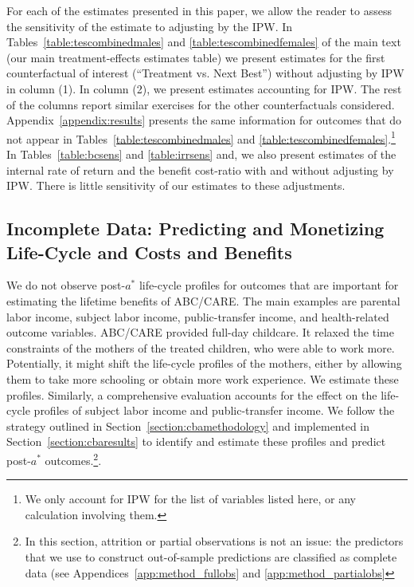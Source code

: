 \noindent For each of the estimates presented in this paper, we allow the reader to assess the sensitivity of the estimate to adjusting by the IPW. In Tables~\ref{table:tescombinedmales} and \ref{table:tescombinedfemales} of the main text (our main treatment-effects estimates table) we present estimates for the first counterfactual of interest (``Treatment vs. Next Best'') without adjusting by IPW in column (1). In column (2), we present estimates accounting for IPW. The rest of the columns report similar exercises for the other counterfactuals considered. Appendix~\ref{appendix:results} presents the same information for outcomes that do not appear in Tables~\ref{table:tescombinedmales} and \ref{table:tescombinedfemales}.\footnote{We only account for IPW for the list of variables listed here, or any calculation involving them.} In Tables~\ref{table:bcsens} and \ref{table:irrsens} and, we also present estimates of the internal rate of return and the benefit cost-ratio with and without adjusting by IPW. There is little sensitivity of our estimates to these adjustments.

\subsection{Incomplete Data: Predicting and Monetizing Life-Cycle and Costs and Benefits} \label{appendix:incomplete}
\label{app:method_noobs}

\noindent We do not observe post-$a^*$ life-cycle profiles for outcomes that are important for estimating the lifetime benefits of ABC/CARE. The main examples are parental labor income, subject labor income, public-transfer income, and health-related outcome variables. ABC/CARE provided full-day childcare. It relaxed the time constraints of the mothers of the treated children, who were able to work more. Potentially, it might shift the life-cycle profiles of the mothers, either by allowing them to take more schooling or obtain more work experience. We estimate these profiles. Similarly, a comprehensive evaluation accounts for the effect on the life-cycle profiles of subject labor income and public-transfer income. We follow the strategy outlined in Section~\ref{section:cbamethodology} and implemented in Section~\ref{section:cbaresults} to identify and estimate these profiles and predict post-$a^\ast$ outcomes.\footnote{In this section, attrition or partial observations is not an issue: the predictors that we use to construct out-of-sample predictions are classified as complete data (see Appendices~\ref{app:method_fullobs} and \ref{app:method_partialobs}}.\\

